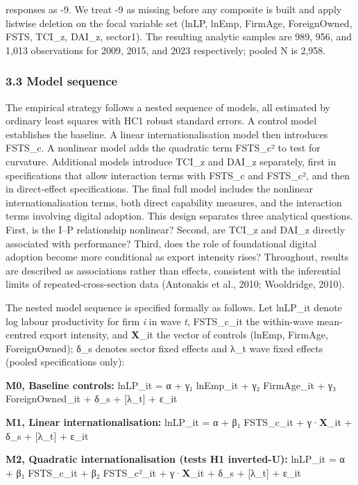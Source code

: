 \documentclass[12pt,a4paper]{article}
\begin{document}
responses as -9. We treat -9 as missing before any composite is built
and apply listwise deletion on the focal variable set (lnLP, lnEmp,
FirmAge, ForeignOwned, FSTS, TCI\_z, DAI\_z, sector1). The resulting
analytic samples are 989, 956, and 1,013 observations for 2009, 2015,
and 2023 respectively; pooled N is 2,958.

\hypertarget{33-model-sequence}{%
\subsubsection{3.3 Model sequence}\label{33-model-sequence}}

The empirical strategy follows a nested sequence of models, all
estimated by ordinary least squares with HC1 robust standard errors. A
control model establishes the baseline. A linear internationalisation
model then introduces FSTS\_c. A nonlinear model adds the quadratic term
FSTS\_c² to test for curvature. Additional models introduce TCI\_z and
DAI\_z separately, first in specifications that allow interaction terms
with FSTS\_c and FSTS\_c², and then in direct-effect specifications. The
final full model includes the nonlinear internationalisation terms, both
direct capability measures, and the interaction terms involving digital
adoption. This design separates three analytical questions. First, is
the I--P relationship nonlinear? Second, are TCI\_z and DAI\_z directly
associated with performance? Third, does the role of foundational
digital adoption become more conditional as export intensity rises?
Throughout, results are described as associations rather than effects,
consistent with the inferential limits of repeated-cross-section data
(Antonakis et al., 2010; Wooldridge, 2010).

The nested model sequence is specified formally as follows. Let lnLP\_it
denote log labour productivity for firm \emph{i} in wave \emph{t},
FSTS\_c\_it the within-wave mean-centred export intensity, and
\textbf{X}\_it the vector of controls (lnEmp, FirmAge, ForeignOwned);
δ\_s denotes sector fixed effects and λ\_t wave fixed effects (pooled
specifications only):

\textbf{M0, Baseline controls:} lnLP\_it = α + γ₁ lnEmp\_it + γ₂
FirmAge\_it + γ₃ ForeignOwned\_it + δ\_s + {[}λ\_t{]} + ε\_it

\textbf{M1, Linear internationalisation:} lnLP\_it = α + β₁ FSTS\_c\_it
+ γ·\textbf{X}\_it + δ\_s + {[}λ\_t{]} + ε\_it

\textbf{M2, Quadratic internationalisation (tests H1 inverted-U):}
lnLP\_it = α + β₁ FSTS\_c\_it + β₂ FSTS\_c²\_it + γ·\textbf{X}\_it +
δ\_s + {[}λ\_t{]} + ε\_it
\end{document}

